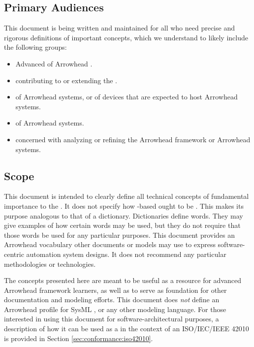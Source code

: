 \subsection{Primary Audiences}
\label{sec:introduction:audiences}

This document is being written and maintained for all who need precise and rigorous definitions of important  concepts, which we understand to likely include the following groups:

\begin{itemize}
\item Advanced  of Arrowhead .
\item {} contributing to or extending the .
\item {} of Arrowhead systems, or of devices that are expected to host Arrowhead systems.
\item {} of Arrowhead systems.
\item {} concerned with analyzing or refining the Arrowhead framework or Arrowhead systems.
\end{itemize}

\subsection{Scope}
\label{sec:introduction:scope}

This document is intended to clearly define all technical concepts of fundamental importance to the .
It does not specify how -based  ought to be .
This makes its purpose analogous to that of a dictionary.
Dictionaries define words.
They may give examples of how certain words may be used, but they do not require that those words be used for any particular purposes.
This document provides an Arrowhead vocabulary other documents or models may use to express software-centric automation system designs.
It does not recommend any particular methodologies or technologies.

The concepts presented here are meant to be useful as a resource for advanced Arrowhead framework learners, as well as to serve as foundation for other documentation and modeling efforts.
This document does \textit{not} define an Arrowhead profile for SysML \cite{omg2019sysml}, or any other modeling language.
For those interested in using this document for software-architectural purposes, a description of how it can be used as a  in the context of an ISO/IEC/IEEE 42010  is provided in Section \ref{sec:conformance:iso42010}.

